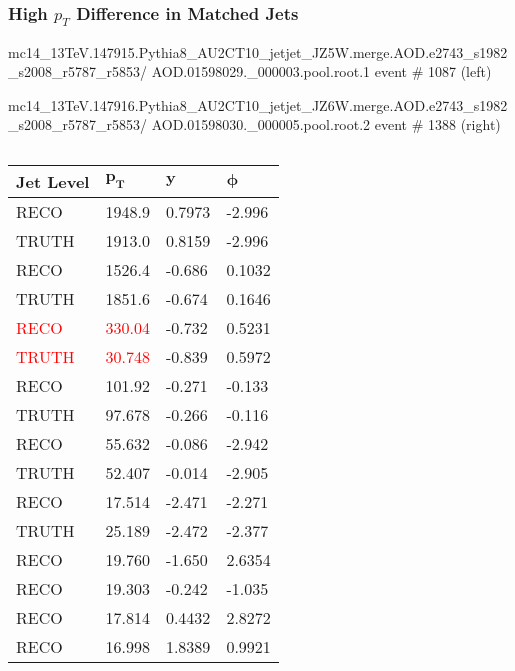\documentclass[compress]{beamer}
\begin{document}

\begin{frame}
\frametitle{High $p_T$ Difference in Matched Jets}
\tiny
mc14\_13TeV.147915.Pythia8\_AU2CT10\_jetjet\_JZ5W.merge.AOD.e2743\_s1982\_s2008\_r5787\_r5853/
\quad   AOD.01598029.\_000003.pool.root.1  \quad  event \# 1087   \quad (left)

mc14\_13TeV.147916.Pythia8\_AU2CT10\_jetjet\_JZ6W.merge.AOD.e2743\_s1982\_s2008\_r5787\_r5853/
\quad   AOD.01598030.\_000005.pool.root.2  \quad  event \# 1388   \quad (right)

\begin{columns}[onlytextwidth]
  \begin{column}{0.5\textwidth}
    \begin{table}
      \begin{tabular}{l l l l}
        \toprule
        \textbf{Jet Level} & $\mathbf{p_T}$ & $\mathbf{y}$ & $\mathbf{\phi}$ \\
        \midrule
        RECO  &  1948.9 &  0.7973 &  -2.996 \\
        TRUTH &  1913.0 &  0.8159 &  -2.996 \\
        \midrule 
        RECO  &  1526.4 &  -0.686 &  0.1032 \\
        TRUTH &  1851.6 &  -0.674 &  0.1646 \\
        \midrule 
        \textcolor{red}{RECO}  &  \textcolor{red}{330.04} &  -0.732 &  0.5231 \\
        \textcolor{red}{TRUTH} &  \textcolor{red}{30.748} &  -0.839 &  0.5972 \\
        \midrule
        RECO  &  101.92 &  -0.271 &  -0.133 \\
        TRUTH &  97.678 &  -0.266 &  -0.116 \\
        \midrule 
        RECO  &  55.632 &  -0.086 &  -2.942 \\
        TRUTH &  52.407 &  -0.014 &  -2.905 \\
        \midrule 
        RECO  &  17.514 &  -2.471 &  -2.271 \\
        TRUTH &  25.189 &  -2.472 &  -2.377 \\
        \midrule
        \midrule
        RECO  &  19.760 &  -1.650 &  2.6354 \\
        RECO  &  19.303 &  -0.242 &  -1.035 \\
        RECO  &  17.814 &  0.4432 &  2.8272 \\
        RECO  &  16.998 &  1.8389 &  0.9921 \\

\end{tabular}
\end{table}
\end{column}
\end{columns}
\end{frame}
\end{document}
